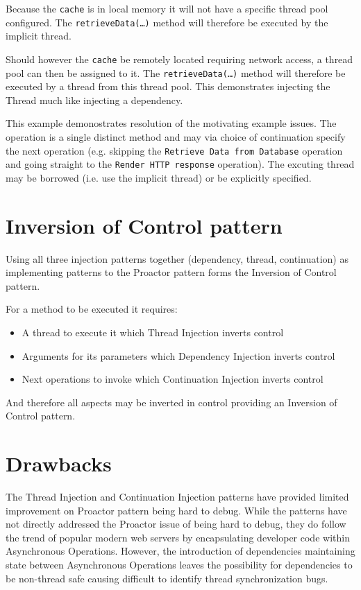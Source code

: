 \documentclass{article}
\begin{document}
Because the \texttt{cache} is in local memory it will not have a specific thread
pool configured.  The \texttt{retrieveData(\ldots)} method will therefore be
executed by the implicit thread.

Should however the \texttt{cache} be remotely located requiring network access,
a thread pool can then be assigned to it.  The \texttt{retrieveData(\ldots)}
method will therefore be executed by a thread from this thread pool.  This
demonstrates injecting the Thread much like injecting a dependency.

This example demonostrates resolution of the motivating example issues.  The
operation is a single distinct method and may via choice of continuation specify
the next operation (e.g. skipping the \texttt{Retrieve Data from Database}
operation and going straight to the \texttt{Render HTTP response} operation).
The excuting thread may be borrowed (i.e. use the implicit thread) or be
explicitly specified.


\section{Inversion of Control pattern}

Using all three injection patterns together (dependency, thread, continuation)
as implementing patterns to the Proactor pattern forms the Inversion of Control
pattern.

For a method to be executed it requires:
\begin{itemize}
  \item A thread to execute it which Thread Injection inverts control
  \item Arguments for its parameters which Dependency Injection inverts control
  \item Next operations to invoke which Continuation Injection inverts control
\end{itemize}

And therefore all aspects may be inverted in control providing an Inversion of
Control pattern.


\section{Drawbacks}

The Thread Injection and Continuation Injection patterns have provided limited
improvement on Proactor pattern being hard to debug.  While the patterns have
not directly addressed the Proactor issue of being hard to debug, they do follow
the trend of popular modern web servers by encapsulating developer code within
Asynchronous Operations.  However, the introduction of dependencies maintaining
state between Asynchronous Operations leaves the possibility for dependencies to
be non-thread safe causing difficult to identify thread synchronization bugs.
\end{document}
